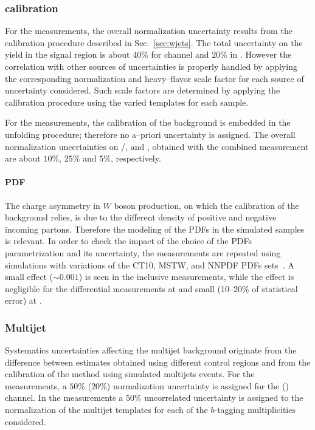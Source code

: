 \subsubsection{\wjets{} calibration}
\label{sec:syst_wjets}

For the \seventev{} measurements, the overall \wjets{} normalization
uncertainty results from the calibration procedure described in
Sec.~\ref{sec:wjets}. The total uncertainty on the \wjets{} yield in
the signal region is about $40\%$ for \ejets{} channel and $20\%$ in
\mujets{}. However the correlation with other sources of uncertainties
is properly handled by applying the corresponding normalization and
heavy--flavor scale factor for each source of uncertainty considered.
Such scale factors are determined by applying the calibration
procedure using the varied templates for each sample.

For the \eighttev{} measurements, the calibration of the \wjets{}
background is embedded in the unfolding procedure; therefore no
a--priori uncertainty is assigned. The overall normalization
uncertainties on \wbb{}/\wcc{}, \wc{} and \wlight, obtained with the
combined \ljets{} measurement  are about $10\%$, $25\%$ and $5\%$,
respectively.

\paragraph{PDF}
\label{sec:syst_pdf}

The charge asymmetry in $W$ boson production, on which the calibration
of the \wjets{} background relies, is due to the different density of
positive and negative incoming partons. Therefore the modeling of the
PDFs in the simulated \wjets{} samples is relevant. In order to check
the impact of the choice of the PDFs parametrization and its
uncertainty, the measurements are repeated using \wjets{} simulations
with variations of the CT10, MSTW, and NNPDF PDFs
sets~\cite{pdf4lhc}. A small effect ($\sim0.001$) is seen in the
inclusive \ac{} measurements, while the effect is negligible for the
differential measurements at \seventev{} and small (10--20\% of
statistical error) at \eighttev{}.

\subsubsection{Multijet}
\label{sec:syst_qcd}

Systematics uncertainties affecting the multijet background originate
from the difference between estimates obtained using different control
regions and from the calibration of the method using simulated
multijets events. For the \seventev{} measurements, a $50\%$ ($20\%$)
normalization uncertainty is assigned for the \ejets{} (\mujets{})
channel.
In the \eighttev{} measurements a $50\%$ uncorrelated uncertainty is assigned to the
normalization of the multijet templates for each of the $b$-tagging
multiplicities considered.

